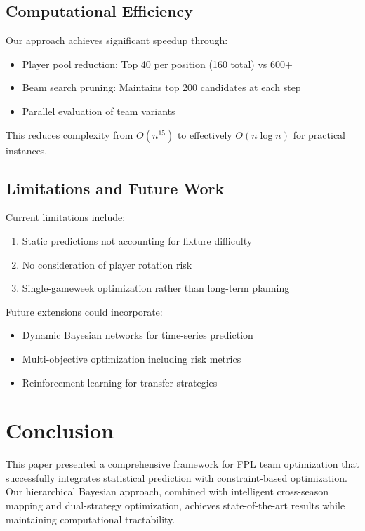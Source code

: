 \documentclass[12pt]{article}
\begin{document}
\subsection{Computational Efficiency}

Our approach achieves significant speedup through:
\begin{itemize}
\item Player pool reduction: Top 40 per position (160 total) vs 600+
\item Beam search pruning: Maintains top 200 candidates at each step
\item Parallel evaluation of team variants
\end{itemize}

This reduces complexity from $O(n^{15})$ to effectively $O(n \log n)$ for practical instances.

\subsection{Limitations and Future Work}

Current limitations include:
\begin{enumerate}
\item Static predictions not accounting for fixture difficulty
\item No consideration of player rotation risk
\item Single-gameweek optimization rather than long-term planning
\end{enumerate}

Future extensions could incorporate:
\begin{itemize}
\item Dynamic Bayesian networks for time-series prediction
\item Multi-objective optimization including risk metrics
\item Reinforcement learning for transfer strategies
\end{itemize}

\section{Conclusion}

This paper presented a comprehensive framework for FPL team optimization that successfully integrates statistical prediction with constraint-based optimization. Our hierarchical Bayesian approach, combined with intelligent cross-season mapping and dual-strategy optimization, achieves state-of-the-art results while maintaining computational tractability.
\end{document}
